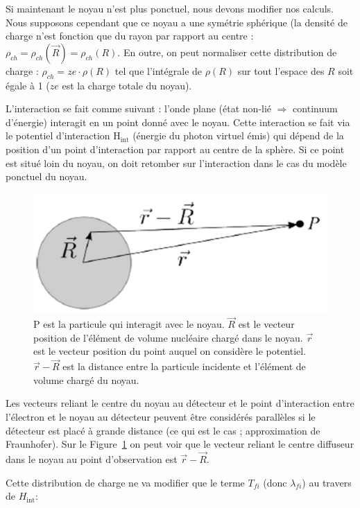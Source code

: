 Si maintenant le noyau n'est plus ponctuel, nous devons modifier nos calculs. Nous supposons cependant que ce noyau a une symétrie sphérique (la densité de charge n'est fonction que du rayon par rapport au centre : $\rho_{ch} = \rho_{ch}(\vec{R}) = \rho_{ch}(R)$. En outre, on peut normaliser cette distribution de charge : $\rho_{ch} = ze\cdot \rho(R)$ tel que l'intégrale de $\rho(R)$ sur tout l'espace des $R$ soit égale à 1 ($ze$ est la charge totale du noyau).

L'interaction se fait comme suivant : l'onde plane (état non-lié $\Rightarrow$ continuum d'énergie) interagit en un point donné avec le noyau. Cette interaction se fait via le potentiel d'interaction H$_\text{int}$ (énergie du photon virtuel émis) qui dépend de la position d'un point d'interaction par rapport au centre de la sphère. Si ce point est situé loin du noyau, on doit retomber sur l'interaction dans le cas du modèle ponctuel du noyau.

\begin{figure}[htpb]
    \centering
    \includegraphics[scale=0.2]{Images4/schema_interaction.png}
    \caption{P est la particule qui interagit avec le noyau. $\vec{R}$ est le vecteur position de l'élément de volume nucléaire chargé dans le noyau. $\vec{r}$ est le vecteur position du point auquel on considère le potentiel. $\vec{r}-\vec{R}$ est la distance entre la particule incidente et l'élément de volume chargé du noyau.}
    \label{fig:schema_interaction}
\end{figure}

Les vecteurs reliant le centre du noyau au détecteur et le point d'interaction entre l'électron et le noyau au détecteur peuvent être considérés parallèles si le détecteur est placé à grande distance (ce qui est le cas ; approximation de Fraunhofer). Sur le Figure~\ref{fig:schema_interaction} on peut voir que le vecteur reliant le centre diffuseur dans le noyau au point d'observation est $\vec{r} - \vec{R}$.

Cette distribution de charge ne va modifier que le terme $T_{fi}$ (donc $\lambda_{fi}$) au travers de $H_\text{int}$:

